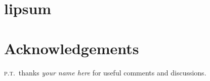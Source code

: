 \documentclass[12pt]{article}
\numberwithin{equation}{section}    %
\begin{document}
 
\section{lipsum}
 
 \lipsum[3-5]

\section*{Acknowledgements}


%
\textsc{p.t.}\ thanks 
\emph{your name here}
for useful comments and discussions. 
%



 
 
\end{document}
